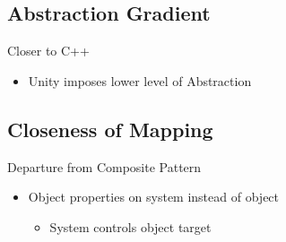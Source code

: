 \subsection{Abstraction Gradient}
\begin{frame}{\secname}{\subsecname}
	Closer to C++
	\begin{itemize}
		\item Unity imposes lower level of Abstraction
	\end{itemize}
\end{frame}

\subsection{Closeness of Mapping}
\begin{frame}{\secname}{\subsecname}
	Departure from Composite Pattern
	\begin{itemize}
		\item<2-> Object properties on system instead of object
		\begin{itemize}
			\item<3-> System controls object target
		\end{itemize}
	\end{itemize}
\end{frame}

